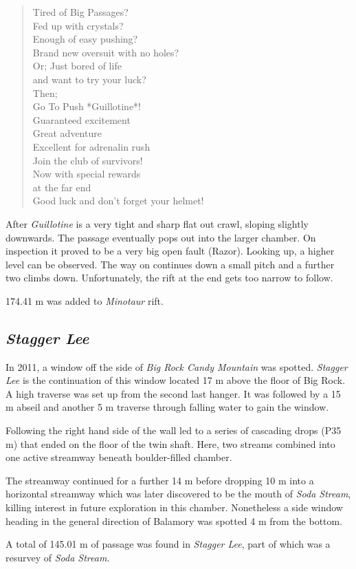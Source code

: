 \begin{verse}
Tired of Big Passages? \\
Fed up with crystals? \\
Enough of easy pushing? \\
Brand new oversuit with no holes? \\

Or; Just bored of life \\
   and want to try your luck? \\

Then; \\ 

Go To Push *Guillotine*! \\

Guaranteed excitement \\
Great adventure \\
Excellent for adrenalin rush \\

Join the club of survivors! \\

Now with special rewards \\
at the far end \\

Good luck and don't forget your helmet!
\end{verse}

After \emph{Guillotine} is a very tight and sharp flat out crawl,
sloping slightly downwards. The passage eventually pops out into the
larger chamber. On inspection it proved to be a very big open fault
(Razor). Looking up, a higher level can be observed. The way on
continues down a small pitch and a further two climbs down.
Unfortunately, the rift at the end gets too narrow to follow.

174.41 m was added to \emph{Minotaur} rift.


\subsection{\texorpdfstring{\emph{Stagger
Lee}}{Stagger Lee}}

In 2011, a window off the side of \emph{Big Rock Candy Mountain} was
spotted. \emph{Stagger Lee} is the continuation of this window located
17 m above the floor of Big Rock. A high traverse was set up from the
second last hanger. It was followed by a 15 m abseil and another 5 m
traverse through falling water to gain the window.

Following the right hand side of the wall led to a series of cascading
drops (P35 m) that ended on the floor of the twin shaft. Here, two
streams combined into one active streamway beneath boulder-filled
chamber.

The streamway continued for a further 14 m before dropping 10 m into a
horizontal streamway which was later discovered to be the mouth of
\emph{Soda Stream}, killing interest in future exploration in this
chamber. Nonetheless a side window heading in the general direction of
Balamory was spotted 4 m from the bottom.

A total of 145.01 m of passage was found in \emph{Stagger Lee}, part of
which was a resurvey of \emph{Soda Stream}.
